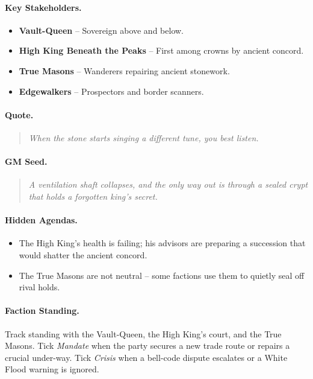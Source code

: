 \paragraph{Key Stakeholders.}
\begin{itemize}
  \item \textbf{Vault-Queen} -- Sovereign above and below.
  \item \textbf{High King Beneath the Peaks} -- First among crowns by ancient concord.
  \item \textbf{True Masons} -- Wanderers repairing ancient stonework.
  \item \textbf{Edgewalkers} -- Prospectors and border scanners.
\end{itemize}

\paragraph{Quote.}
\begin{quote}
\emph{\textquotedbl When the stone starts singing a different tune, you best listen.\textquotedbl}
\end{quote}

\paragraph{GM Seed.}
\begin{quote}
\emph{A ventilation shaft collapses, and the only way out is through a sealed crypt that holds a forgotten king's secret.}
\end{quote}

\paragraph{Hidden Agendas.}
\begin{itemize}
  \item The High King's health is failing; his advisors are preparing a succession that would shatter the ancient concord.
  \item The True Masons are not neutral -- some factions use them to quietly seal off rival holds.
\end{itemize}

\paragraph{Faction Standing.}
Track standing with the Vault-Queen, the High King's court, and the True Masons. Tick \textit{Mandate} when the party secures a new trade route or repairs a crucial under-way. Tick \textit{Crisis} when a bell-code dispute escalates or a White Flood warning is ignored.


